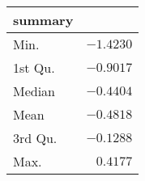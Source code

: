 \begin{table}[!tbp]
\begin{center}
\begin{tabular}{lr}
\hline\hline
\multicolumn{1}{l}{summary}&\multicolumn{1}{c}{}\tabularnewline
\hline
Min.&$-1.4230$\tabularnewline
1st Qu.&$-0.9017$\tabularnewline
Median&$-0.4404$\tabularnewline
Mean&$-0.4818$\tabularnewline
3rd Qu.&$-0.1288$\tabularnewline
Max.&$ 0.4177$\tabularnewline
\hline
\end{tabular}\end{center}

\end{table}

